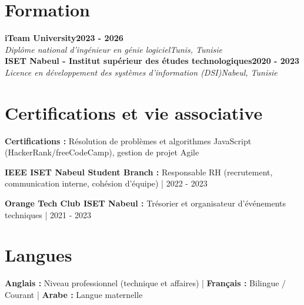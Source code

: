 \documentclass[letterpaper,10pt]{article}
\newcommand{\heading}[2]{\hspace{10pt}#1\hfill#2\\}
\newcommand{\headingBf}[2]{\heading{\textbf{#1}}{\textbf{#2}}}
\newcommand{\headingIt}[2]{\heading{\textit{#1}}{\textit{#2}}}
\newenvironment{resume_list}{
  \vspace{-7pt}
  \begin{itemize}[itemsep=-2pt, parsep=1pt, leftmargin=30pt]
}{
  \end{itemize}
}
\begin{document}
\section{Formation}

\headingBf{iTeam University}{2023 - 2026}

\headingIt{Diplôme national d'ingénieur en génie logiciel}{Tunis, Tunisie}

\headingBf{ISET Nabeul - Institut supérieur des études technologiques}{2020 - 2023}

\headingIt{Licence en développement des systèmes d'information (DSI)}{Nabeul, Tunisie}

\section{Certifications et vie associative}

\begin{resume_list}

  \item \textbf{Certifications :} Résolution de problèmes et algorithmes JavaScript (HackerRank/freeCodeCamp), gestion de projet Agile

  \item \textbf{IEEE ISET Nabeul Student Branch :} Responsable RH (recrutement, communication interne, cohésion d'équipe) | 2022 - 2023

  \item \textbf{Orange Tech Club ISET Nabeul :} Trésorier et organisateur d'événements techniques | 2021 - 2023

\end{resume_list}

\section{Langues}

\begin{resume_list}

  \item \textbf{Anglais :} Niveau professionnel (technique et affaires) | \textbf{Français :} Bilingue / Courant | \textbf{Arabe :} Langue maternelle

\end{resume_list}
\end{document}
